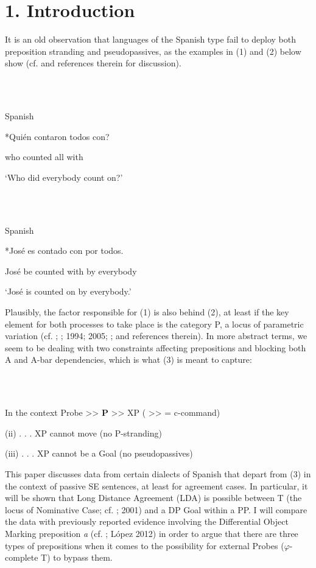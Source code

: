 \documentclass[output=paper]{langsci/langscibook}
\begin{document}
\section{ 1. Introduction}

It is an old observation that languages of the Spanish type fail to deploy both preposition stranding and pseudopassives, as the examples in (1) and (2) below show (cf. \citealt{Law2006} and references therein for discussion). 

\ea%
    \label{ex:key:1}
    \gll\\
        \\
    \glt
    \z

          Spanish

*Quién contaron todos con?                                                  

  who    counted  all      with

           ‘Who did everybody count on?’

\ea%
    \label{ex:key:2}
    \gll\\
        \\
    \glt
    \z

          Spanish

*José es contado con   por todos.                                           

José be counted with by   everybody

‘José is counted on by everybody.’

\citep[741]{Campos1991}

Plausibly, the factor responsible for (1) is also behind (2), at least if the key element for both processes to take place is the category P, a locus of parametric variation (cf. \citet{Hornstein1981}; \citealt{Kayne1984}; 1994; 2005; \citealt{Abels2003}; and references therein). In more abstract terms, we seem to be dealing with two constraints affecting prepositions and blocking both A and A-bar dependencies, which is what (3) is meant to capture:

\ea%
    \label{ex:key:3}
    \gll\\
        \\
    \glt
    \z

          In the context Probe >>  \textbf{P}  >>  XP  ( >> = c-command)

  (ii) . . . XP cannot move (no P-stranding)

  (iii) . . . XP cannot be a Goal (no pseudopassives)

This paper discusses data from certain dialects of Spanish that depart from (3) in the context of passive SE sentences, at least for agreement cases. In particular, it will be shown that Long Distance Agreement (LDA) is possible between T (the locus of Nominative Case; cf. \citealt{Chomsky2000}; 2001) and a DP Goal within a PP. I will compare the data with previously reported evidence involving the Differential Object Marking preposition \textit{a} (cf. \citealt{Torrego1998}; López 2012) in order to argue that there are three types of prepositions when it comes to the possibility for external Probes ($\varphi $-complete T) to bypass them.
\end{document}
